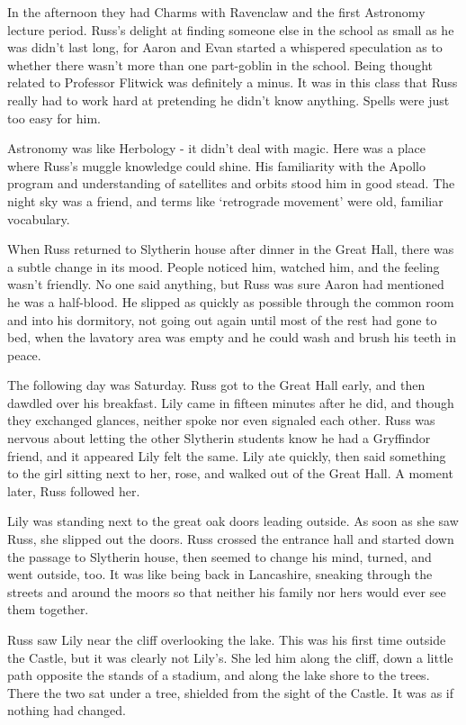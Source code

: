 In the afternoon they had Charms with Ravenclaw and the first Astronomy lecture period. Russ's delight at finding someone else in the school as small as he was didn't last long, for Aaron and Evan started a whispered speculation as to whether there wasn't more than one part-goblin in the school. Being thought related to Professor Flitwick was definitely a minus. It was in this class that Russ really had to work hard at pretending he didn't know anything. Spells were just too easy for him.

Astronomy was like Herbology - it didn't deal with magic. Here was a place where Russ's muggle knowledge could shine. His familiarity with the Apollo program and understanding of satellites and orbits stood him in good stead. The night sky was a friend, and terms like `retrograde movement' were old, familiar vocabulary.

When Russ returned to Slytherin house after dinner in the Great Hall, there was a subtle change in its mood. People noticed him, watched him, and the feeling wasn't friendly. No one said anything, but Russ was sure Aaron had mentioned he was a half-blood. He slipped as quickly as possible through the common room and into his dormitory, not going out again until most of the rest had gone to bed, when the lavatory area was empty and he could wash and brush his teeth in peace.

The following day was Saturday. Russ got to the Great Hall early, and then dawdled over his breakfast. Lily came in fifteen minutes after he did, and though they exchanged glances, neither spoke nor even signaled each other. Russ was nervous about letting the other Slytherin students know he had a Gryffindor friend, and it appeared Lily felt the same. Lily ate quickly, then said something to the girl sitting next to her, rose, and walked out of the Great Hall. A moment later, Russ followed her.

Lily was standing next to the great oak doors leading outside. As soon as she saw Russ, she slipped out the doors. Russ crossed the entrance hall and started down the passage to Slytherin house, then seemed to change his mind, turned, and went outside, too. It was like being back in Lancashire, sneaking through the streets and around the moors so that neither his family nor hers would ever see them together.

Russ saw Lily near the cliff overlooking the lake. This was his first time outside the Castle, but it was clearly not Lily's. She led him along the cliff, down a little path opposite the stands of a stadium, and along the lake shore to the trees. There the two sat under a tree, shielded from the sight of the Castle. It was as if nothing had changed.

